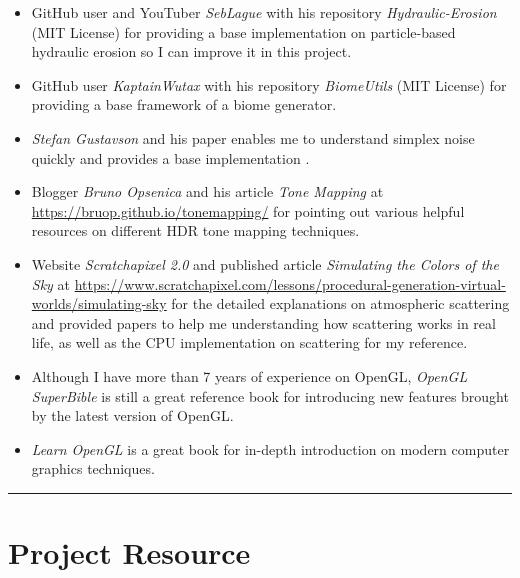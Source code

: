\documentclass[oneside, a4paper]{report}
\begin{document}
    \begin{itemize}[label=\(\diamond\)]
        \item GitHub user and YouTuber \textit{SebLague} with his repository \textit{Hydraulic-Erosion} (MIT License) for providing a base implementation on particle-based hydraulic erosion so I can improve it in this project.
        \item GitHub user \textit{KaptainWutax} with his repository \textit{BiomeUtils} (MIT License) for providing a base framework of a biome generator.
        \item \textit{Stefan Gustavson} and his paper enables me to understand simplex noise quickly and provides a base implementation \cite{simplex_demystified}.
        \item Blogger \textit{Bruno Opsenica} and his article \textit{Tone Mapping} at \url{https://bruop.github.io/tonemapping/} for pointing out various helpful resources on different HDR tone mapping techniques.
        \item Website \textit{Scratchapixel 2.0} and published article \textit{Simulating the Colors of the Sky} at \url{https://www.scratchapixel.com/lessons/procedural-generation-virtual-worlds/simulating-sky} for the detailed explanations on atmospheric scattering and provided papers to help me understanding how scattering works in real life, as well as the CPU implementation on scattering for my reference.
        \item Although I have more than 7 years of experience on OpenGL, \textit{OpenGL SuperBible} \cite{opengl_superbible} is still a great reference book for introducing new features brought by the latest version of OpenGL.
        \item \textit{Learn OpenGL} \cite{learn_opengl} is a great book for in-depth introduction on modern computer graphics techniques.
    \end{itemize}

    \rule{\textwidth}{1pt}

    \clearpage
    
    

    \titleformat{\chapter}[display]{\bfseries\huge}{\appendixname{} \thechapter}{20pt}{\bfseries\LARGE}
    \appendix

    \chapter{Project Resource}
    \label{project_resource}
\end{document}
